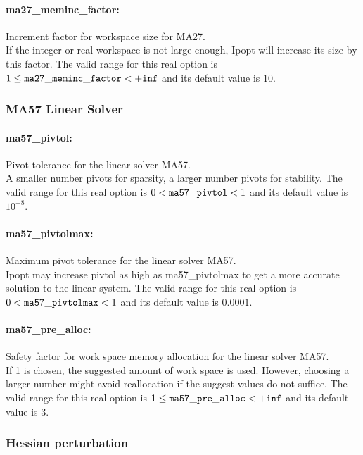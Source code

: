 \paragraph{ma27\_meminc\_factor:} Increment factor for workspace size for MA27. $\;$ \\
If the integer or real workspace is not large enough, Ipopt will increase its size by this factor.
The valid range for this real option is $1 \le {\tt ma27\_meminc\_factor } <  {\tt +inf}$ and its default value is $10$.

\subsubsection{MA57 Linear Solver}

\paragraph{ma57\_pivtol:} Pivot tolerance for the linear solver MA57. $\;$ \\
A smaller number pivots for sparsity, a larger number pivots for stability.
The valid range for this real option is $0 <  {\tt ma57\_pivtol } <  1$ and its default value is $10^{-8}$.


\paragraph{ma57\_pivtolmax:} Maximum pivot tolerance for the linear solver MA57. $\;$ \\
Ipopt may increase pivtol as high as ma57\_pivtolmax to get a more accurate solution to the linear system.
The valid range for this real option is $0 <  {\tt ma57\_pivtolmax } <  1$ and its default value is $0.0001$.


\paragraph{ma57\_pre\_alloc:} Safety factor for work space memory allocation for the linear solver MA57. $\;$ \\
If 1 is chosen, the suggested amount of work space is used.
However, choosing a larger number might avoid reallocation if the suggest values do not suffice.
The valid range for this real option is $1 \le {\tt ma57\_pre\_alloc } <  {\tt +inf}$ and its default value is $3$.



\subsubsection{Hessian perturbation}


